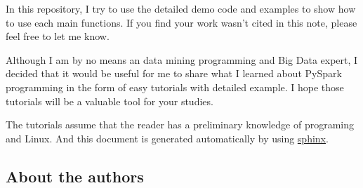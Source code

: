 \documentclass[letterpaper,11pt,english]{sphinxmanual}
\begin{document}
In this repository, I try to use the detailed demo code and
examples to show how to use each main functions. If you find
your work wasn’t cited in this note, please feel free to let
me know.

Although I am by no means an data mining programming and Big Data expert,
I decided that it would be useful for me to share what I learned
about PySpark programming in the form of easy tutorials with
detailed example. I hope those tutorials will be a valuable tool
for your studies.

The tutorials assume that the reader has a preliminary knowledge
of programing and Linux. And this document is generated automatically
by using \href{http://sphinx.pocoo.org}{sphinx}.


\subsection{About the authors}
\end{document}
